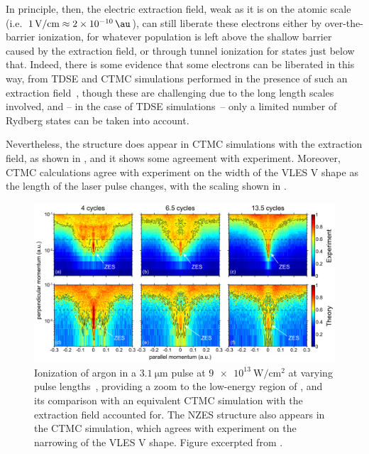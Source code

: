 In principle, then, the electric extraction field, weak as it is on the atomic scale (i.e.~$\SI{1}{\volt/\centi\meter}\approx \SI{2e-10}{\au}$), can still liberate these electrons either by over-the-barrier ionization, for whatever population is left above the shallow barrier caused by the extraction field, or through tunnel ionization for states just below that. Indeed, there is some evidence that some electrons can be liberated in this way, from TDSE and CTMC simulations performed in the presence of such an extraction field~\cite{ZES_paper, Rost_latest}, though these are challenging due to the long length scales involved, and -- in the case of TDSE simulations~-- only a limited number of Rydberg states can be taken into account.


Nevertheless, the structure does appear in CTMC simulations with the extraction field, as shown in , and it shows some agreement with experiment. Moreover, CTMC calculations agree with experiment on the width of the VLES V shape as the length of the laser pulse changes, with the scaling shown in .

\begin{figure}[b!]
  \centering
  \includegraphics[width=\textwidth]{6-LES/Figures/figure6Q.png}
  \caption[
  Photoelectron momentum maps from measurements and CTMC simulations, showing a narrowing of the VLES V shape for longer pulses, together with a NZES-like structure, as observed by B. Wolter et al.
  ]{
  Ionization of argon in a $\SI{3.1}{\micro\meter}$ pulse at $\SI{9e13}{\watt/\centi\meter^2}$ at varying pulse lengths~\cite{ZES_paper}, providing a zoom to the low-energy region of , and its comparison with an equivalent CTMC simulation with the extraction field accounted for. The NZES structure also appears in the CTMC simulation, which agrees with experiment on the narrowing of the VLES V shape.
  Figure excerpted from .
  }
\label{f6-wolter-nzes-original-figure}
\end{figure}




